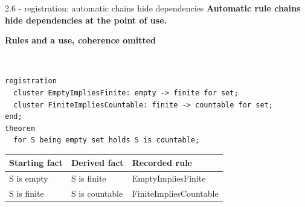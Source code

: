 \documentclass[aspectratio=169,11pt]{beamer}
\newcommand{\statusbadge}[2]{\colorbox{#1}{\textcolor{white}{\strut\scriptsize\sffamily\bfseries #2}}}
\newcommand{\badgeSketch}{\statusbadge{orange!75!black}{sketch}}
\begin{document}
\begin{frame}[fragile,t]{2.6 - registration: automatic chains hide dependencies}
\textcolor{blue!55!black}{\textbf{Automatic rule chains hide dependencies at the point of use.}}

\smallskip
\textbf{Rules and a use, coherence omitted}~\badgeSketch
\begin{lstlisting}[language={mizar},basicstyle=\ttfamily\small]
registration
  cluster EmptyImpliesFinite: empty -> finite for set;
  cluster FiniteImpliesCountable: finite -> countable for set;
end;
theorem
  for S being empty set holds S is countable;
\end{lstlisting}
\par{}
\begin{footnotesize}
\setlength{\tabcolsep}{3pt}
\renewcommand{\arraystretch}{1.15}
\begin{tabular}{lll}
\toprule
\textbf{Starting fact} & \textbf{Derived fact} & \textbf{Recorded rule} \\
\midrule
S is empty & S is finite & EmptyImpliesFinite \\
S is finite & S is countable & FiniteImpliesCountable \\
\bottomrule
\end{tabular}
\end{footnotesize}


\end{frame}
\end{document}
